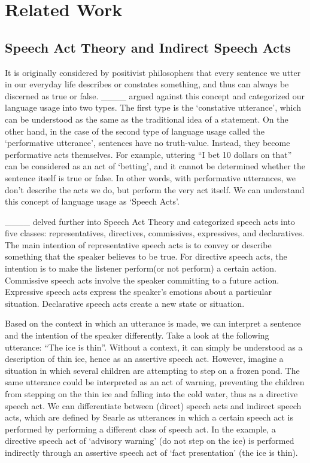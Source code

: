 \section{Related Work}
\subsection*{Speech Act Theory and Indirect Speech Acts}

It is originally considered by positivist philosophers that every sentence we utter in our everyday life describes or constates something, and thus can always be discerned as true or false. ____ argued against this concept and categorized our language usage into two types. The first type is the ‘constative utterance’, which can be understood as the same as the traditional idea of a statement. On the other hand, in the case of the second type of language usage called the ‘performative utterance’, sentences have no truth-value. Instead, they become performative acts themselves. For example, uttering “I bet 10 dollars on that” can be considered as an act of ‘betting’, and it cannot be determined whether the sentence itself is true or false. In other words, with performative utterances, we don’t describe the acts we do, but perform the very act itself. We can understand this concept of language usage as ‘Speech Acts’.

____ delved further into Speech Act Theory and categorized speech acts into five classes: representatives, directives, commissives, expressives, and declaratives. The main intention of representative speech acts is to convey or describe something that the speaker believes to be true. For directive speech acts, the intention is to make the listener perform(or not perform) a certain action. Commissive speech acts involve the speaker committing to a future action. Expressive speech acts express the speaker’s emotions about a particular situation. Declarative speech acts create a new state or situation.

Based on the context in which an utterance is made, we can interpret a sentence and the intention of the speaker differently. Take a look at the following utterance: “The ice is thin”. Without a context, it can simply be understood as a description of thin ice, hence as an assertive speech act. However, imagine a situation in which several children are attempting to step on a frozen pond. The same utterance could be interpreted as an act of warning, preventing the children from stepping on the thin ice and falling into the cold water, thus as a directive speech act. We can differentiate between (direct) speech acts and indirect speech acts, which are defined by Searle as utterances in which a certain speech act is performed by performing a different class of speech act. In the example, a directive speech act of ‘advisory warning’ (do not step on the ice) is performed indirectly through an assertive speech act of ‘fact presentation’ (the ice is thin).


